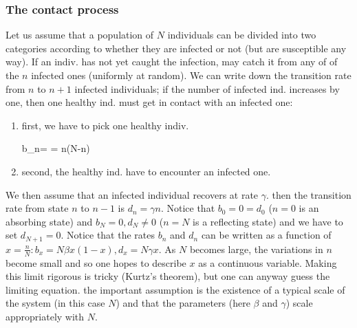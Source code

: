 \subsubsection*{The contact process}
Let us assume that a population of $N$ individuals can be divided into two
categories according to whether they are infected or not (but are susceptible
any way). If an indiv. has not yet caught the infection, may catch it from any
of of the $n$ infected ones (uniformly at random).
We can write down the transition rate from $n$ to $n+1$ infected individuals;
if the number of infected ind. increases by one, then one healthy ind. must get
in contact with an infected one:
\begin{enumerate}
  \item first, we have to pick one healthy indiv.
    \begin{DispWithArrows}[displaystyle, format=c]
      b_{n}=\tilde{\beta}  = n(N-n)
    \end{DispWithArrows}
  \item second, the healthy ind. have to encounter an infected one.
\end{enumerate}
We then assume that an infected individual recovers at rate $\gamma$. then the
transition rate from state $n$ to $n-1$ is $d_{n}=\gamma n$. Notice that
$b_{0}=0=d_{0}$ ($n=0$ is an absorbing state) and $b_{N}=0, d_{N} \neq 0$
($n=N$ is a reflecting state) and we have to set $d_{N+1}=0$.
Notice that the rates $b_{n}$ and $d_{n}$ can be written as a function of
$x=\frac{n}{N}: b_{x}=N \beta x(1-x), d_{x}=N \gamma x$.
As $N$ becomes large, the variations in $n$ become small and so one hopes to
describe $x$ as a continuous variable. Making this limit rigorous is tricky
(Kurtz's theorem), but one can anyway guess the limiting equation. the important
assumption is the existence of a typical scale of the system (in this case $N$)
and that the parameters (here $\beta$ and $\gamma$) scale appropriately with
$N$.

